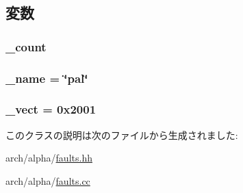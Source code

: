 \subsection{変数}
\hypertarget{classAlphaISA_1_1PalFault_a4bff925c412f331c5aaf6a39b79619ff}{
\subsubsection[{\_\-count}]{ {\bf \_\-count}}}
\label{classAlphaISA_1_1PalFault_a4bff925c412f331c5aaf6a39b79619ff}
\hypertarget{classAlphaISA_1_1PalFault_ac79073ffcd2c66a09bcd3bd3ad206019}{
\subsubsection[{\_\-name}]{ {\bf \_\-name} = \char`\"{}pal\char`\"{}}}
\label{classAlphaISA_1_1PalFault_ac79073ffcd2c66a09bcd3bd3ad206019}
\hypertarget{classAlphaISA_1_1PalFault_ad9e5855b9db0b2824cf6c507be4a872e}{
\subsubsection[{\_\-vect}]{ {\bf \_\-vect} = 0x2001}}
\label{classAlphaISA_1_1PalFault_ad9e5855b9db0b2824cf6c507be4a872e}


このクラスの説明は次のファイルから生成されました:\begin{DoxyCompactItemize}
\item 
arch/alpha/\hyperlink{arch_2alpha_2faults_8hh}{faults.hh}\item 
arch/alpha/\hyperlink{arch_2alpha_2faults_8cc}{faults.cc}\end{DoxyCompactItemize}
